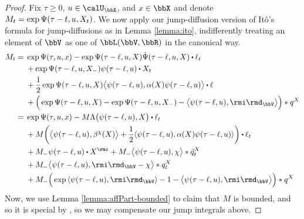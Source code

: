 \begin{proof}
  \label{proof:proposition:affine-resolution}
  Fix $\tau \geq 0$, $\momentVar \in \boundedSpace$, and $\stateVar \in \stateSpace$ and denote $M_t = \exp\Psi(\tau-t, u, X_t)$.
  We now apply our jump-diffusion version of It\^o's formula for jump-diffusions as in Lemma \ref{lemma:ito}, indifferently treating an element of $\vecSpace$ as one of $\bbL(\vecSpace, \bbR)$ in the canonical way.
  \begin{align*}
    M_t 
    &= \begin{aligned}[t]
      &\exp\aff(\tau, \momentVar, \stateVar) 
      - \exp\aff(\tau-\leb, \momentVar, \X) \dot\aff(\tau-\leb, \momentVar, \X) \shortInt \leb_t  \\
      &+ \exp\aff(\tau-\leb, \momentVar, \X_-) \affPart(\tau-\leb, \momentVar) \shortInt \X_t  \\
      &+ \frac12 \exp\aff(\tau-\leb, \momentVar, \X) \bprj{\affPart(\tau-\leb,\momentVar)}{\affDiff(\X)\affPart(\tau-\leb,\momentVar)} \shortInt \leb \\
      &+ \Big( \exp\aff(\tau-\leb, \momentVar, \X) - \exp\aff(\tau-\leb, \momentVar, \X_-) - \bprj{\affPart(\tau-\leb, \momentVar)}{\id_\vecSpace} \Big) \ast \jumpMeas^\X
    \end{aligned} \\
    &= \begin{aligned}[t]
      &\exp\aff(\tau, \momentVar, \stateVar) 
      - M \ode\big(\affPart(\tau-\leb, \momentVar), \X\big) \shortInt \leb_t \\
      &+ M \bigg( \bprj{\affPart(\tau-\leb, \momentVar)}{\affDrift^\trunc(\X)} + \frac12 \prj{\affPart(\tau-\leb,\momentVar)}{\affDiff(\X)\affPart(\tau-\leb,\momentVar)} \bigg) \shortInt \leb_t \\
      &+ M_- \affPart(\tau-\leb, \momentVar) \shortInt \X^\rmc
      + M_- \bprj{\affPart(\tau-\leb,\momentVar)}{\trunc} \ast \compensate{\jumpMeas^\X}_t  \\
      &+ M_- \bprj{\affPart(\tau-\leb, \momentVar)}{\id_\vecSpace-\trunc} \ast \jumpMeas^\X_t  \\
      &+ M_- \Big( \exp\prj{\affPart(\tau-\leb,\momentVar)}{\id_\vecSpace} - 1 - \bprj{\affPart(\tau-\leb, \momentVar)}{\id_\vecSpace} \Big) \ast \jumpMeas^\X
    \end{aligned} 
  \end{align*}
  Now, we use Lemma \ref{lemma:affPart-bounded} to claim that $M$ is bounded, and so it is special by \cite[Lemma I.4.24]{jacod2003}, so we may compensate our jump integrals above.

\end{proof}
